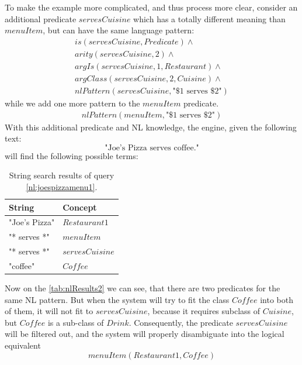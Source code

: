 To make the example more complicated, and thus process more clear, consider
an additional predicate $servesCuisine$ which has a totally different meaning
than $menuItem$, but can have the same language pattern:
\begin{equation*}
\begin{gathered}
    is(servesCuisine,Predicate) \land \\
	arity(servesCuisine,2)\land\\
	argIs(servesCuisine,1,Restaurant) \land\\
	argClass(servesCuisine,2, Cuisine) \land \\
	nlPattern(servesCuisine, \text{"\$1 serves \$2"}) 
\end{gathered}
\end{equation*}
while we add one more pattern to the $menuItem$ predicate.
\begin{equation*}
\begin{gathered}
	nlPattern(menuItem, \text{"\$1 serves \$2"}) 
\end{gathered}
\end{equation*}
With this additional predicate and NL knowledge, the engine, given the following
text:
\begin{equation}\label{nl:joespizzamenu1}
\text{"Joe's Pizza serves coffee."}
\end{equation}
will find the following possible terms:

\begin{table}[H]
\centering
\caption{String search results of query \ref{nl:joespizzamenu1}.}
\label{tab:nlResults2}
\begin{tabular}{|l|l|}
	\hline
	\textbf{String} & \textbf{Concept} \\
    \hline
    "Joe's Pizza" & $Restaurant1$ \\
    \hline
    "* serves *" & $menuItem$ \\
    \hline
	"* serves *" & $servesCuisine$\\
	\hline
    "coffee" & $Coffee$ \\
    \hline
\end{tabular}
\end{table}
Now on the \autoref{tab:nlResults2} we can see, that there are two predicates
for the same NL pattern. But when the system will try to fit the class $Coffee$
into both of them, it will not fit to $servesCuisine$, because it requires
subclass of $Cuisine$, but $Coffee$ is a sub-class of $Drink$. Consequently,
the predicate $servesCuisine$ will be filtered out, and the system will
properly disambiguate into the logical equivalent
\begin{equation*}
	menuItem(Restaurant1,Coffee)
\end{equation*}


